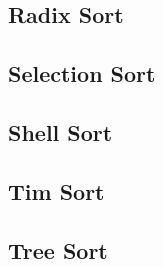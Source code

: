 \documentclass{article}
\begin{document}
\subsection{Radix Sort}
\subsection{Selection Sort}
\subsection{Shell Sort}
\subsection{Tim Sort}
\subsection{Tree Sort}
\end{document}
